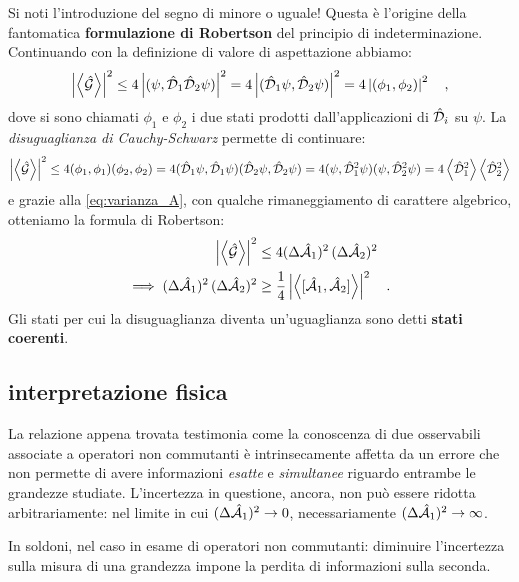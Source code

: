 Si noti l'introduzione del segno di minore o uguale! Questa è l'origine della fantomatica \textbf{formulazione di Robertson} del principio di indeterminazione. Continuando con la definizione di valore di aspettazione abbiamo:
\[
    \begin{aligned}
        \left| \left\langle \hat{\mathcal{G}} \right\rangle \right|^2 \leq 4\left| (\psi, \hat{\mathcal{D}}_1\hat{\mathcal{D}}_2\psi) \right|^2 = 4\left| (\hat{\mathcal{D}}_1\psi, \hat{\mathcal{D}}_2\psi) \right|^2 = 4\left| (\phi_1, \phi_2) \right|^2 \quad,
    \end{aligned}
\]
dove si sono chiamati $\phi_1$ e $\phi_2$ i due stati prodotti dall'applicazioni di $\hat{\mathcal{D}}_i$ su $\psi$. La \emph{disuguaglianza di Cauchy-Schwarz} permette di continuare:
\[
    \begin{aligned}
        \left| \left\langle \hat{\mathcal{G}} \right\rangle \right|^2 \leq 4(\phi_1, \phi_1)(\phi_2, \phi_2) = 4(\hat{\mathcal{D}}_1\psi, \hat{\mathcal{D}}_1\psi)(\hat{\mathcal{D}}_2\psi, \hat{\mathcal{D}}_2\psi) = 4(\psi, \hat{\mathcal{D}}_1^2 \psi)(\psi, \hat{\mathcal{D}}_2^2 \psi) = 4\left\langle \hat{\mathcal{D}}_1^2 \right\rangle\left\langle \hat{\mathcal{D}}_2^2 \right\rangle
    \end{aligned}
\]
e grazie alla \eqref{eq:varianza_A}, con qualche rimaneggiamento di carattere algebrico, otteniamo la formula di Robertson:
\begin{equation}
    \begin{aligned}
    \left| \left\langle \hat{\mathcal{G}} \right\rangle \right|^2 &\leq 4(\Delta \hat{\mathcal{A}}_1)^2 \, (\Delta \hat{\mathcal{A}}_2)^2 \\
    \implies (\Delta \hat{\mathcal{A}}_1)^2 \, (\Delta \hat{\mathcal{A}}_2)^2 &\geq \frac{1}{4} \left| \left\langle [\hat{\mathcal{A}}_1, \hat{\mathcal{A}}_2] \right\rangle \right|^2 \quad.
    \end{aligned}
\end{equation}
Gli stati per cui la disuguaglianza diventa un'uguaglianza sono detti \textbf{stati coerenti}.

\subsection{interpretazione fisica}
La relazione appena trovata testimonia come la conoscenza di due osservabili associate a operatori non commutanti è intrinsecamente affetta da un errore che non permette di avere informazioni \emph{esatte} e \emph{simultanee} riguardo entrambe le grandezze studiate. L'incertezza in questione, ancora, non può essere ridotta arbitrariamente: nel limite in cui $(\Delta \hat{\mathcal{A}}_1)^2 \to 0$, necessariamente $(\Delta \hat{\mathcal{A}}_1)^2 \to \infty$. 

In soldoni, nel caso in esame di operatori non commutanti: diminuire l'incertezza sulla misura di una grandezza impone la perdita di informazioni sulla seconda. 

